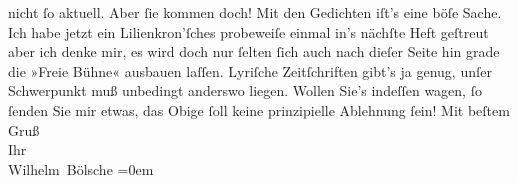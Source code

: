 \begin{ledgroupsized}[t]{13cm}
                    nicht ſo aktuell. Aber ſie kommen doch!\pend
           \pstart
           Mit den Gedichten iſt’s eine böſe Sache. Ich habe jetzt ein Lilienkron’ſches probeweiſe einmal
                    in’s nächſte Heft geſtreut {\pb}aber ich denke mir, es
                    wird doch nur ſelten ſich auch nach dieſer Seite hin grade die »Freie Bühne« ausbauen laſſen. Lyriſche Zeitſchriften gibt’s
                    ja genug, unſer Schwerpunkt muß unbedingt anderswo liegen. Wollen Sie’s indeſſen
                    wagen, ſo ſenden Sie mir etwas, das Obige ſoll keine prinzipielle Ablehnung
                    ſein!\pend
           \pstart
           Mit beſtem Gruß{\\[\baselineskip]}Ihr{\\[\baselineskip]}\spacefill\mbox{Wilhelm Bölsche}\pend
           \leftskip=0em{}\endnumbering{}\end{ledgroupsized}  \newcommand{\dateiname}{L00087}\newcommand{\titel}{Wilhelm Bölsche an Arthur Schnitzler, 24. 3. 1892}\newcommand{\editorInnen}{Martin Anton Müller und Gerd-Hermann Susen}
      